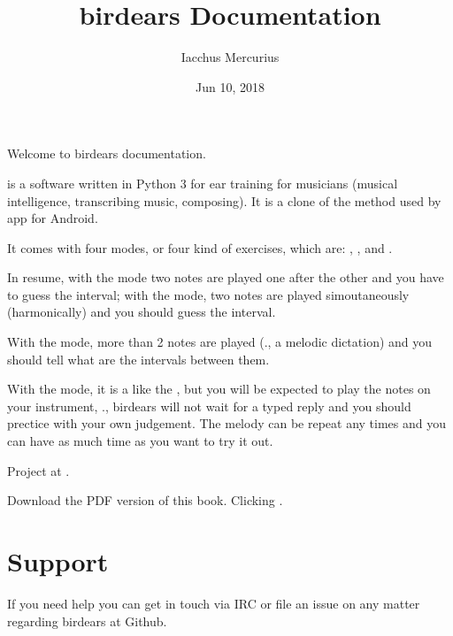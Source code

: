 \documentclass[letterpaper,10pt,english]{sphinxmanual}
\title{birdears Documentation}
\date{Jun 10, 2018}
\author{Iacchus Mercurius}
\begin{document}
\maketitle
\sphinxtableofcontents
{}\label{\detokenize{index::doc}}


Welcome to birdears documentation.

 is a software written in Python 3 for ear training for
musicians (musical intelligence, transcribing music, composing). It is a
clone of the method used by 
app for Android.

It comes with four modes, or four kind of exercises, which are:
, ,  and .

In resume, with the  mode two notes are played one after the
other and you have to guess the interval; with the  mode,
two notes are played simoutaneously (harmonically) and you should guess
the interval.

With the  mode, more than 2 notes are played (., a
melodic dictation) and you should tell what are the intervals between
them.

With the  mode, it is a like the , but you will
be expected to play the notes on your instrument, ., birdears will
not wait for a typed reply and you should prectice with your own
judgement. The melody can be repeat any times and you can have as much
time as you want to try it out.

Project at .

Download the PDF version of this book. Clicking .




\chapter{Support}
\label{\detokenize{community:birdears-documentation}}\label{\detokenize{community:support}}\label{\detokenize{community::doc}}
If you need help you can get in touch via IRC or file an issue on any matter regarding birdears at Github.
\end{document}
